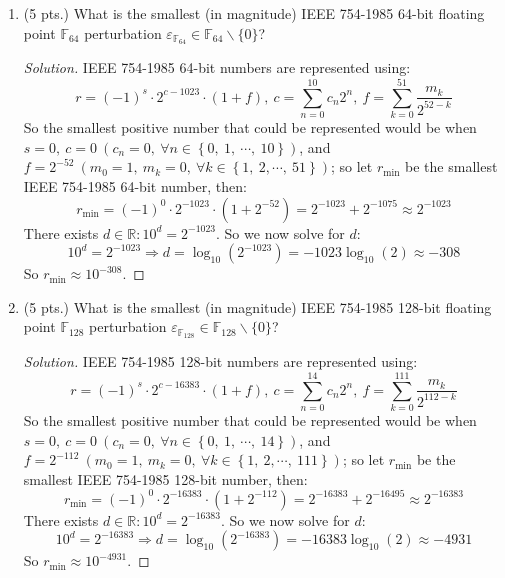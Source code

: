 \documentclass[12pt]{article}
\newcommand{\parens}[1]{\left(#1\right)}
\newcommand{\bracks}[1]{\left\{#1\right\}}
\begin{document}
\begin{enumerate}
\begin{enumerate}
\begin{enumerate}
     \item (5 pts.) What is the smallest (in magnitude) IEEE 754-1985 64-bit
       floating point $\mathbb{F}_{64}$ perturbation
       $\varepsilon_{\mathbb{F}_{64}} \in \mathbb{F}_{64} \backslash \{0\}$?
       \begin{proof}[Solution]
       IEEE 754-1985 64-bit numbers are represented using:
       $$r = (-1)^s\cdot 2^{c-1023}\cdot(1+f),\ c = \sum_{n=0}^{10}c_n2^n,\ f = \sum_{k=0}^{51}\frac{m_k}{2^{52-k}}$$
       So the smallest positive number that could be represented would be when $s = 0,\ c = 0\ (c_n = 0,\ \forall n \in \bracks{0,\ 1,\ \cdots,\ 10})$, and $f = 2^{-52}\ (m_0 = 1,\ m_k = 0,\ \forall k \in \bracks{1,\ 2, \cdots,\ 51})$; so let $r_{\text{min}}$ be the smallest  IEEE 754-1985 64-bit number, then:
       $$r_{\text{min}} = (-1)^0\cdot 2^{-1023}\cdot \parens{1 + 2^{-52}} = 2^{-1023} + 2^{-1075} \approx 2^{-1023}$$
       There exists $d \in \mathbb{R}: 10^d = 2^{-1023}$. So we now solve for $d$:
       $$10^d = 2^{-1023} \Rightarrow d = \log_{10}\parens{2^{-1023}} = -1023\log_{10}(2) \approx -308$$
       So $r_{\text{min}} \approx 10^{-308}$.
       \end{proof}


     \item (5 pts.) What is the smallest (in magnitude) IEEE 754-1985 128-bit
       floating point $\mathbb{F}_{128}$ perturbation
       $\varepsilon_{\mathbb{F}_{128}} \in \mathbb{F}_{128} \backslash \{0\}$?
       \begin{proof}[Solution]
       IEEE 754-1985 128-bit numbers are represented using:
       $$r = (-1)^s\cdot 2^{c-16383}\cdot(1+f),\ c = \sum_{n=0}^{14}c_n2^n,\ f = \sum_{k=0}^{111}\frac{m_k}{2^{112-k}}$$
       So the smallest positive number that could be represented would be when $s = 0,\ c = 0\ (c_n = 0,\ \forall n \in \bracks{0,\ 1,\ \cdots,\ 14})$, and $f = 2^{-112}\ (m_0 = 1,\ m_k = 0,\ \forall k \in \bracks{1,\ 2, \cdots,\ 111})$; so let $r_{\text{min}}$ be the smallest  IEEE 754-1985 128-bit number, then:
       $$r_{\text{min}} = (-1)^0\cdot 2^{-16383}\cdot \parens{1 + 2^{-112}} = 2^{-16383} + 2^{-16495} \approx 2^{-16383}$$
       There exists $d \in \mathbb{R}: 10^d = 2^{-16383}$. So we now solve for $d$:
       $$10^d = 2^{-16383} \Rightarrow d = \log_{10}\parens{2^{-16383}} = -16383\log_{10}(2) \approx -4931$$
       So $r_{\text{min}} \approx 10^{-4931}$.
       \end{proof}
       
     \end{enumerate}


\end{enumerate}
\end{enumerate}
\end{document}
